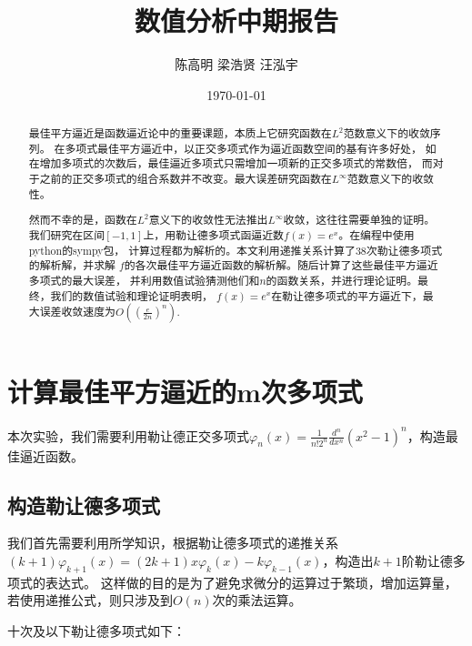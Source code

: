 \documentclass{article}
\title{\heiti 数值分析中期报告}
\author{陈高明 \quad 梁浩贤 \quad 汪泓宇}
\date{\today}
\begin{document}
\maketitle

	\begin{abstract}
        最佳平方逼近是函数逼近论中的重要课题，本质上它研究函数在$L^2$范数意义下的收敛序列。
        在多项式最佳平方逼近中，以正交多项式作为逼近函数空间的基有许多好处，
        如在增加多项式的次数后，最佳逼近多项式只需增加一项新的正交多项式的常数倍，
        而对于之前的正交多项式的组合系数并不改变。最大误差研究函数在$L^\infty$范数意义下的收敛性。
        
        然而不幸的是，函数在$L^2$意义下的收敛性无法推出$L^\infty$收敛，这往往需要单独的证明。
        我们研究在区间$[-1,1]$上，用勒让德多项式函逼近数$f(x)=e^x$。在编程中使用python的sympy包，
        计算过程都为解析的。本文利用递推关系计算了38次勒让德多项式的解析解，并求解
        $f$的各次最佳平方逼近函数的解析解。随后计算了这些最佳平方逼近多项式的最大误差，
        并利用数值试验猜测他们和$n$的函数关系，并进行理论证明。最终，我们的数值试验和理论证明表明，
        $f(x)=e^x$在勒让德多项式的平方逼近下，最大误差收敛速度为$O((\frac{e}{2n})^n).$ \\
    \end{abstract}
    
    \section{计算最佳平方逼近的m次多项式}
    本次实验，我们需要利用勒让德正交多项式$\varphi_n(x)=\frac{1}{n!2^n}\frac{d^n}{dx^n}(x^2-1)^n$，构造最佳逼近函数。
    
    \subsection{构造勒让德多项式}
    我们首先需要利用所学知识，根据勒让德多项式的递推关系$(k+1)\varphi_{k+1}(x)=(2k+1)x\varphi_k(x)-k\varphi_{k-1}(x)$，构造出$k+1$阶勒让德多项式的表达式。
    这样做的目的是为了避免求微分的运算过于繁琐，增加运算量，若使用递推公式，则只涉及到$O(n)$次的乘法运算。
    
    十次及以下勒让德多项式如下：
    
\end{document}
